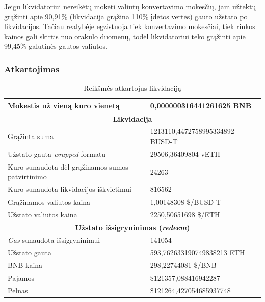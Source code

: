 \documentclass[]{VUMIFTemplateClass}
\begin{document}
\noindent
Jeigu likvidatoriui nereikėtų mokėti valiutų konvertavimo mokesčių, 
jam užtektų grąžinti apie 90,91\% (likvidacija grąžina 110\% įdėtos vertės) 
gauto užstato po likvidacijos. Tačiau realybėje egzistuoja tiek 
konvertavimo mokesčiai, tiek rinkos kainos gali skirtis nuo orakulo 
duomenų, todėl likvidatoriui teko grąžinti apie 99,45\% galutinės 
gautos valiutos.

\subsubsection{Atkartojimas}

\begin{table}[h!]
  \centering
  \begin{tabular}{|l|l|}
    \hline
    Mokestis už vieną kuro vienetą                           & 0,000000316441261625 BNB        \\
  \hline
  \multicolumn{2}{|c|}{\textbf{Likvidacija}}                              \\ \hline
  Grąžinta suma                            & 1213110,4472758995334892 BUSD-T         \\ \hline
  Užstato gauta \textit{wrapped} formatu             & 29506,36409804 vETH                     \\ \hline
  Kuro sunaudota dėl grąžinamos sumos patvirtinimo            & 24263                              \\ \hline
  Kuro sunaudota likvidacijos iškvietimui              & 816562                             \\ \hline
  Grąžinamos valiutos kaina               & 1,00148308 \$/BUSD-T               \\ \hline
  Užstato valiutos kaina          & 2250,50651698 \$/ETH            \\ \hline
  \multicolumn{2}{|c|}{\textbf{Užstato išsigryninimas (\textit{redeem})}}                                         \\ \hline
  \textit{Gas} sunaudota išsigryninimui                   & 141054                             \\ \hline
  Užstato gauta           & 593,762633190749838213 ETH             \\ \hline
  BNB kaina                & 298,22744081 \$/BNB             \\ \hline
  Pajamos                & \$121357,088416942287              \\ \hline
  Pelnas                 & \$121264,427054685937748              \\ \hline
  \end{tabular}
  \caption{Reikšmės atkartojus likvidaciją}
  \label{liquidation_example_repeat}
  \end{table}
\end{document}
